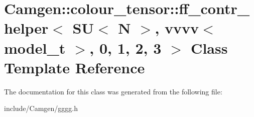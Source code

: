 \hypertarget{a00225}{\section{Camgen\-:\-:colour\-\_\-tensor\-:\-:ff\-\_\-contr\-\_\-helper$<$ S\-U$<$ N $>$, vvvv$<$ model\-\_\-t $>$, 0, 1, 2, 3 $>$ Class Template Reference}
\label{a00225}
}


The documentation for this class was generated from the following file\-:\begin{DoxyCompactItemize}
\item 
include/\-Camgen/gggg.\-h\end{DoxyCompactItemize}
